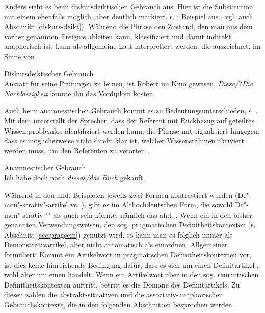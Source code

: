 Anders sieht es beim diskursdeiktischen  Gebrauch aus. Hier ist die Substitution mit einem  ebenfalls möglich, aber deutlich markiert, s. ; Beispiel aus \textcite[95]{Marx2011}, vgl. auch Abschnitt \ref{diskurs-deikt}). Während die Phrase   den Zustand, den man aus dem vorher genannten Ereignis ableiten kann, klassifiziert und damit indirekt anaphorisch   ist, kann  als allgemeine Last interpretiert werden, die  auszeichnet, im Sinne von .

\begin{exe}
	\ex \label{ex:diskurs-deikt-def} Diskursdeiktischer Gebrauch\\ Anstatt für seine Prüfungen zu lernen, ist Robert im Kino gewesen. \textit{Diese\slash}?\textit{Die Nachlässigkeit} könnte ihn das Vordiplom kosten.
	 \end{exe}

Auch beim anamnestischen  Gebrauch kommt es zu Bedeutungsunterschieden, s. . Mit dem  unterstellt der Sprecher,  dass der Referent mit Rückbezug auf geteiltes Wissen problemlos identifiziert werden kann; die Phrase  mit  signalisiert hingegen, dass es möglicherweise nicht direkt klar ist, welcher Wissensrahmen aktiviert werden muss, um den Referenten zu verorten \parencite[79--80]{Bisle-Muller1991}. 
 
\begin{exe}
	\ex \label{ex:anamndef}Anamnestischer Gebrauch\\Ich habe doch noch \textit{dieses/das Buch} gekauft.
\end{exe}
 
Während in den nhd. Beispielen jeweils zwei Formen kontrastiert wurden (De"-mon"-strativ"-artikel   vs.  ), gibt es im Althochdeutschen  Form, die sowohl De"-mon"-strativ-""  als auch  sein könnte, nämlich das ahd. . 
Wenn ein   in den bisher genannten Verwendungsweisen, den sog. pragmatischen  Definitheitskontexten (s. Abschnitt \ref{sec:pragsem}) genutzt wird, so kann man es folglich immer als Demonstrativartikel, aber nicht automatisch als  einordnen. Allgemeiner formuliert: Kommt ein Artikelwort in pragmatischen Definitheitskontexten  vor, ist dies keine  hinreichende Bedingung dafür, dass es sich um einen Definitartikel-, wohl aber um einen  handelt. Wenn ein Artikelwort aber in den sog. semantischen Definitheitskontexten  auftritt, betritt es die Domäne des Definitartikels. Zu diesen zählen die abstrakt-situativen  und die assoziativ-anaphorischen  Gebrauchskontexte, die in den folgenden Abschnitten besprochen werden. 



